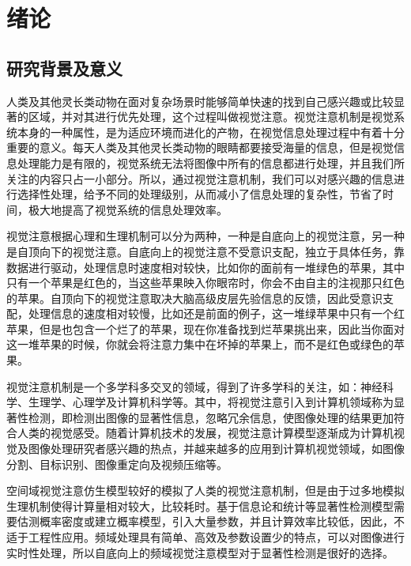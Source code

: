 

\chapter{绪论}
\label{cha1}

\section{研究背景及意义}
\label{1_1}

人类及其他灵长类动物在面对复杂场景时能够简单快速的找到自己感兴趣或比较显著的区域，并对其进行优先处理，这个过程叫做视觉注意。视觉注意机制是视觉系统本身的一种属性，是为适应环境而进化的产物，在视觉信息处理过程中有着十分重要的意义。每天人类及其他灵长类动物的眼睛都要接受海量的信息，但是视觉信息处理能力是有限的，视觉系统无法将图像中所有的信息都进行处理，并且我们所关注的内容只占一小部分。所以，通过视觉注意机制，我们可以对感兴趣的信息进行选择性处理，给予不同的处理级别，从而减小了信息处理的复杂性，节省了时间，极大地提高了视觉系统的信息处理效率。

视觉注意根据心理和生理机制可以分为两种，一种是自底向上的视觉注意，另一种是自顶向下的视觉注意。自底向上的视觉注意不受意识支配，独立于具体任务，靠数据进行驱动，处理信息时速度相对较快，比如你的面前有一堆绿色的苹果，其中只有一个苹果是红色的，当这些苹果映入你眼帘时，你会不由自主的注视那只红色的苹果。自顶向下的视觉注意取决大脑高级皮层先验信息的反馈，因此受意识支配，处理信息的速度相对较慢，比如还是前面的例子，这一堆绿苹果中只有一个红苹果，但是也包含一个烂了的苹果，现在你准备找到烂苹果挑出来，因此当你面对这一堆苹果的时候，你就会将注意力集中在坏掉的苹果上，而不是红色或绿色的苹果。

视觉注意机制是一个多学科多交叉的领域，得到了许多学科的关注，如：神经科学、生理学、心理学及计算机科学等。其中，将视觉注意引入到计算机领域称为显著性检测，即检测出图像的显著性信息，忽略冗余信息，使图像处理的结果更加符合人类的视觉感受。随着计算机技术的发展，视觉注意计算模型逐渐成为计算机视觉及图像处理研究者感兴趣的热点，并越来越多的应用到计算机视觉领域\cite{BorjiTPAMI2013State}，如图像分割、目标识别、图像重定向及视频压缩等。

空间域视觉注意仿生模型较好的模拟了人类的视觉注意机制，但是由于过多地模拟生理机制使得计算量相对较大，比较耗时。基于信息论和统计等显著性检测模型需要估测概率密度或建立概率模型，引入大量参数，并且计算效率比较低，因此，不适于工程性应用。频域处理具有简单、高效及参数设置少的特点，可以对图像进行实时性处理，所以自底向上的频域视觉注意模型对于显著性检测是很好的选择。

